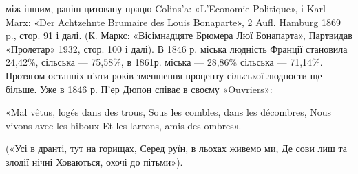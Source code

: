 між іншим, раніш цитовану працю Colins’a: «L’Economie Politique», і
Karl Marx: «Der Achtzehnte Brumaire des Louis Bonaparte», 2 Aufl.
Hamburg 1869 p., стор. 91 і далі. (К. Маркс: «Вісімнадцяте Брюмера Люї
Бонапарта», Партвидав «Пролетар» 1932, стор. 100 і далі). В 1846 р.
міська людність Франції становила 24,42\%, сільська — 75,58\%, в 1861р.
міська — 28,86\% сільська — 71,14\%. Протягом останніх п’яти років
зменшення проценту сільської людности ще більше. Уже в 1846 р. П’ер
Дюпон співає в своєму «Ouvriers»:

«Mal vêtus, logés dans des trous,
Sous les combles, dans les décombres,
Nous vivons avec les hiboux
Et les larrons, amis des ombres».

(«Усі в дранті, тут на горищах,
Серед руїн, в льохах живемо ми,
Де сови лиш та злодії нічні
Ховаються, охочі до пітьми»).
\parbreak{}  %
